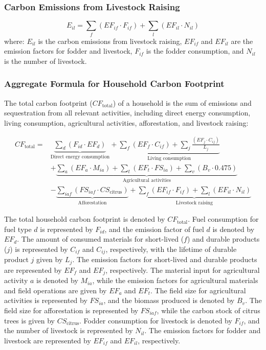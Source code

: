 \documentclass[12pt,a4paper]{article}
\begin{document}
\subsubsection*{Carbon Emissions from Livestock Raising}
\begin{equation}
E_{il} = \sum_f (EF_{if} \cdot F_{if}) + \sum_l (EF_{il} \cdot N_{il})
\end{equation}
where: $E_{il}$ is the carbon emissions from livestock raising, $EF_{if}$ and $EF_{il}$ are the emission factors for fodder and livestock, $F_{if}$ is the fodder consumption, and $N_{il}$ is the number of livestock.



\subsubsection*{Aggregate Formula for Household Carbon Footprint}

The total carbon footprint ($CF_{\text{total}}$) of a household is the sum of emissions and sequestration from all relevant activities, including direct energy consumption, living consumption, agricultural activities, afforestation, and livestock raising:

\begin{align}
CF_{\text{total}} = & \underbrace{\sum_d \left(F_{id} \cdot EF_d\right)}_{\text{Direct energy consumption}} + 
\underbrace{\sum_f \left(EF_f \cdot C_{if}\right) + \sum_j \frac{\left(EF_j \cdot C_{ij}\right)}{L_j}}_{\text{Living consumption}} \nonumber \\
& + \underbrace{\sum_a \left(EF_a \cdot M_{ia}\right) + \sum_t \left(EF_t \cdot FS_{ia}\right) + \sum_v \left(B_v \cdot 0.475\right)}_{\text{Agricultural activities}} \nonumber \\
& - \underbrace{\sum_{iaf} \left(FS_{iaf} \cdot CS_{\text{citrus}}\right)}_{\text{Afforestation}} +
\underbrace{\sum_f \left(EF_{if} \cdot F_{if}\right) + \sum_l \left(EF_{il} \cdot N_{il}\right)}_{\text{Livestock raising}}
\end{align}


The total household carbon footprint is denoted by $CF_{\text{total}}$. Fuel consumption for fuel type $d$ is represented by $F_{id}$, and the emission factor of fuel $d$ is denoted by $EF_d$. The amount of consumed materials for short-lived ($f$) and durable products ($j$) is represented by $C_{if}$ and $C_{ij}$, respectively, with the lifetime of durable product $j$ given by $L_j$. The emission factors for short-lived and durable products are represented by $EF_f$ and $EF_j$, respectively. The material input for agricultural activity $a$ is denoted by $M_{ia}$, while the emission factors for agricultural materials and field operations are given by $EF_a$ and $EF_t$. The field size for agricultural activities is represented by $FS_{ia}$, and the biomass produced is denoted by $B_v$. The field size for afforestation is represented by $FS_{iaf}$, while the carbon stock of citrus trees is given by $CS_{\text{citrus}}$. Fodder consumption for livestock is denoted by $F_{if}$, and the number of livestock is represented by $N_{il}$. The emission factors for fodder and livestock are represented by $EF_{if}$ and $EF_{il}$, respectively.
\end{document}
